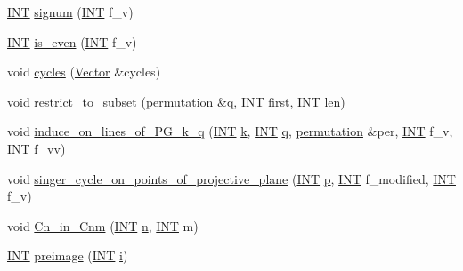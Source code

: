\begin{DoxyCompactItemize}
\item 
\mbox{\hyperlink{galois_8h_a09fddde158a3a20bd2dcadb609de11dc}{I\+NT}} \mbox{\hyperlink{classpermutation_a51cfe6b579a1d45524f39096c22c4398}{signum}} (\mbox{\hyperlink{galois_8h_a09fddde158a3a20bd2dcadb609de11dc}{I\+NT}} f\+\_\+v)
\item 
\mbox{\hyperlink{galois_8h_a09fddde158a3a20bd2dcadb609de11dc}{I\+NT}} \mbox{\hyperlink{classpermutation_a7b410bb3cb56dfcb5e5f2976b1d1aa45}{is\+\_\+even}} (\mbox{\hyperlink{galois_8h_a09fddde158a3a20bd2dcadb609de11dc}{I\+NT}} f\+\_\+v)
\item 
void \mbox{\hyperlink{classpermutation_a88706cf2c683df70a29156f39b3e4895}{cycles}} (\mbox{\hyperlink{class_vector}{Vector}} \&cycles)
\item 
void \mbox{\hyperlink{classpermutation_a9d9fa353830f05cbfd2080e3e87260d2}{restrict\+\_\+to\+\_\+subset}} (\mbox{\hyperlink{classpermutation}{permutation}} \&\mbox{\hyperlink{simeon_8_c_a92cbb483a3b27ae1a0dbfcb125ce216f}{q}}, \mbox{\hyperlink{galois_8h_a09fddde158a3a20bd2dcadb609de11dc}{I\+NT}} first, \mbox{\hyperlink{galois_8h_a09fddde158a3a20bd2dcadb609de11dc}{I\+NT}} len)
\item 
void \mbox{\hyperlink{classpermutation_a3e01585ffb15282fc45a3158c5ad0b76}{induce\+\_\+on\+\_\+lines\+\_\+of\+\_\+\+P\+G\+\_\+k\+\_\+q}} (\mbox{\hyperlink{galois_8h_a09fddde158a3a20bd2dcadb609de11dc}{I\+NT}} \mbox{\hyperlink{classdiscreta__base_a6f7a0f7bdd115b9e4dde358cfa7ebf81}{k}}, \mbox{\hyperlink{galois_8h_a09fddde158a3a20bd2dcadb609de11dc}{I\+NT}} \mbox{\hyperlink{simeon_8_c_a92cbb483a3b27ae1a0dbfcb125ce216f}{q}}, \mbox{\hyperlink{classpermutation}{permutation}} \&per, \mbox{\hyperlink{galois_8h_a09fddde158a3a20bd2dcadb609de11dc}{I\+NT}} f\+\_\+v, \mbox{\hyperlink{galois_8h_a09fddde158a3a20bd2dcadb609de11dc}{I\+NT}} f\+\_\+vv)
\item 
void \mbox{\hyperlink{classpermutation_a013701d741e69609903a93f3874308f4}{singer\+\_\+cycle\+\_\+on\+\_\+points\+\_\+of\+\_\+projective\+\_\+plane}} (\mbox{\hyperlink{galois_8h_a09fddde158a3a20bd2dcadb609de11dc}{I\+NT}} \mbox{\hyperlink{alphabet2_8_c_a533391314665d6bf1b5575e9a9cd8552}{p}}, \mbox{\hyperlink{galois_8h_a09fddde158a3a20bd2dcadb609de11dc}{I\+NT}} f\+\_\+modified, \mbox{\hyperlink{galois_8h_a09fddde158a3a20bd2dcadb609de11dc}{I\+NT}} f\+\_\+v)
\item 
void \mbox{\hyperlink{classpermutation_a42c6adacfca83d855da8a2a38e300057}{Cn\+\_\+in\+\_\+\+Cnm}} (\mbox{\hyperlink{galois_8h_a09fddde158a3a20bd2dcadb609de11dc}{I\+NT}} \mbox{\hyperlink{simeon_8_c_a7f2cd26777ce0ff3fdaf8d02aacbddfb}{n}}, \mbox{\hyperlink{galois_8h_a09fddde158a3a20bd2dcadb609de11dc}{I\+NT}} m)
\item 
\mbox{\hyperlink{galois_8h_a09fddde158a3a20bd2dcadb609de11dc}{I\+NT}} \mbox{\hyperlink{classpermutation_a224e460e2d774a36a52b4d233d117988}{preimage}} (\mbox{\hyperlink{galois_8h_a09fddde158a3a20bd2dcadb609de11dc}{I\+NT}} \mbox{\hyperlink{alphabet2_8_c_acb559820d9ca11295b4500f179ef6392}{i}})
\end{DoxyCompactItemize}
